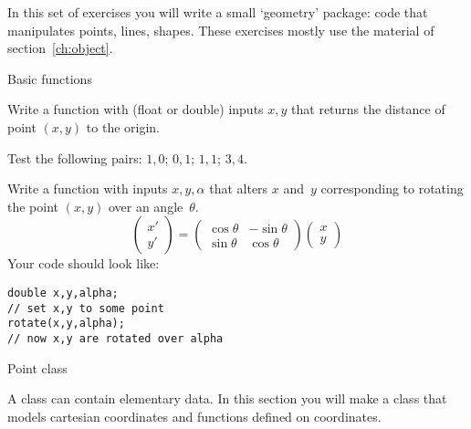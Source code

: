 
In this set of exercises you will write a small `geometry' package:
code that manipulates points, lines, shapes.
These exercises mostly use the material of section~\ref{ch:object}.

 {Basic functions}
\label{sec:geom-basic}

\begin{exercise}
  \label{ex:pointdistance}
  Write a function with (float or double) inputs $x,y$ that returns the distance of
  point $(x,y)$ to the origin.

  Test the following pairs: $1,0$; $0,1$; $1,1$; $3,4$.
\end{exercise}

\begin{exercise}
  \label{ex:pointrotate}
  Write a function with inputs $x,y,\alpha$ that alters $x$ and~$y$
  corresponding to rotating the point $(x,y)$ over an angle~$\theta$.
  \[
  \begin{pmatrix}
    x'\\y'
  \end{pmatrix} =
  \begin{pmatrix}
    \cos\theta& -\sin\theta\\ \sin\theta&\cos\theta
  \end{pmatrix}
  \begin{pmatrix}
    x\\y
  \end{pmatrix}
  \]
  Your code should look like:
\begin{verbatim}
double x,y,alpha;
// set x,y to some point
rotate(x,y,alpha);
// now x,y are rotated over alpha
\end{verbatim}
\end{exercise}

 {Point class}
\label{ex:pointfunc}

\prerequisite{\ref{sec:object}}

A class can contain elementary data. In this section you will make a
 class that models cartesian coordinates and functions
defined on coordinates.

